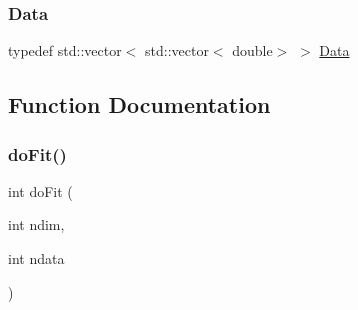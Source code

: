 \subsubsection{\texorpdfstring{Data}{Data}}
{\footnotesize\ttfamily typedef std\+::vector$<$ std\+::vector$<$ double$>$ $>$ \mbox{\hyperlink{adat-devel_2other__libs_2minuit_2test_2MnSim_2ParallelTest_8cxx_a1766b42441c3f4d78bb2b56263a8e058}{Data}}}



\subsection{Function Documentation}
\mbox{\label{adat-devel_2other__libs_2minuit_2test_2MnSim_2ParallelTest_8cxx_ad2424cde5fec20b83f95e54a5f134ad6}} 
\subsubsection{\texorpdfstring{doFit()}{doFit()}}
{\footnotesize\ttfamily int do\+Fit (\begin{DoxyParamCaption}\item[{int}]{ndim,  }\item[{int}]{ndata }\end{DoxyParamCaption})}

